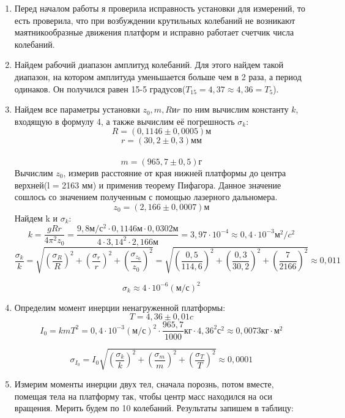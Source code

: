 \documentclass[a4paper,12pt]{article} %
\begin{document}
\begin{enumerate}
\item Перед началом работы я проверила исправность установки для измерений, то есть проверила, что при возбуждении крутильных колебаний не возникают маятникообразные движения платформ и исправно работает счетчик числа колебаний.


\item Найдем рабочий диапазон амплитуд колебаний. Для этого найдем такой диапазон, на котором амплитуда уменьшается больше чем в 2 раза, а период одинаков. Он получился равен 15-5 градусов($T_{15} = 4, 37\approx 4,36 = T_{5}$).

\item Найдем все параметры установки $z_0, m, R и r$ по ним вычислим константу $k$, входящую в формулу 4,  а также вычислим её погрешность $\sigma_k$:
\[R = (0,1146 \pm 0,0005) м\]
\[r = (30,2 \pm 0,3) мм\]\
\[m = (965,7 \pm 0,5) г\]
Вычислим $z_0$, измерив расстояние от края нижней платформы до центра верхней(l = 2163 мм) и применив теорему Пифагора. Данное значение сошлось со значением полученным с помощью лазерного дальномера.
\[ z_0 = (2,166 \pm 0,0007) м\]
Найдем k и $\sigma_k$:
\[ k = \frac{gRr}{4\pi^2 z_0} = \frac{9,8 м/с^2 \cdot 0,1146 м \cdot 0,0302 м}{4\cdot 3,14^2 \cdot 2,166 м} = 3,97 \cdot 10^{-4} \approx 0,4 \cdot 10^{-3} м^2/c^2\]
\[ \frac{\sigma_k}{k} = \sqrt{(\frac{\sigma_R}{R})^2+(\frac{\sigma_r}{r})^2+(\frac{\sigma_{z_0}}{z_0})^2} = \sqrt{(\frac{0,5}{114,6})^2+(\frac{0,3}{30,2})^2+(\frac{7}{2166})^2} \approx 0,011\]

\[\sigma_k \approx 4\cdot 10^{-6}(м/с)^2\]


\item Определим момент инерции ненагруженной платформы:
\[T = 4, 36 \pm 0,01 c \]
\[ I_0 = kmT^2=0,4\cdot 10^{-3} (м/с)^2\cdot \frac{965,7}{1000}кг\cdot 4,36^2с^2\approx 0,0073 кг\cdot м^2\]

\[\sigma_{I_0} = I_0\sqrt{(\frac{\sigma_k}{k})^2+(\frac{\sigma_m}{m})^2+(\frac{\sigma_{T}}{T})^2}\approx 0,0001\]

\item Измерим моменты инерции двух тел, сначала порознь, потом вместе, помещая тела на платформу так, чтобы центр масс находился на оси вращения. Мерить будем по 10 колебаний.
Результаты запишем в таблицу:


\end{enumerate}
\end{document}
